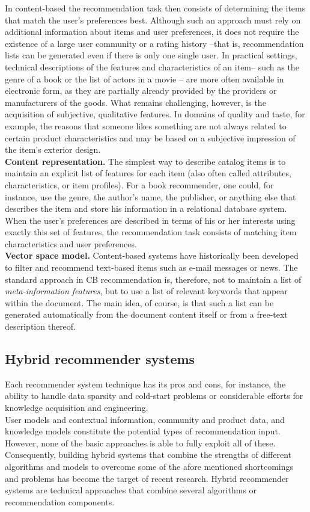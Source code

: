 In content-based the recommendation task then consists of determining
the items that match the user’s preferences best. Although such an
approach must rely on additional information about items and user
preferences, it does not require the existence of a large user
community or a rating history –that is, recommendation lists can be
generated even if there is only one single user. In practical
settings, technical descriptions of the features and characteristics
of an item– such as the genre of a book or the list of actors in a
movie – are more often available in electronic form, as they are
partially already provided by the providers or manufacturers of the
goods. What remains challenging, however, is the acquisition of
subjective, qualitative features. In domains of quality and taste, for
example, the reasons that someone likes something are not always
related to certain product characteristics and may be based on a
subjective impression of the item’s exterior design.   \\
\textbf{Content representation.} The simplest way to describe catalog
items is to maintain an explicit list of features for each item (also
often called attributes, characteristics, or item profiles). For a
book recommender, one could, for instance, use the genre, the author’s
name, the publisher, or anything else that describes the item and
store his information in a relational database system. When the user’s
preferences are described in terms of his or her interests using
exactly this set of features, the recommendation task consists of
matching item characteristics and user preferences.  \\
\textbf{Vector space model.}  Content-based systems have historically
been developed to filter and recommend text-based items such as e-mail
messages or news. The standard approach in CB recommendation is,
therefore, not to maintain a list of \textit{meta-information
features}, but to use a list of relevant keywords that appear within
the document. The main idea, of course, is that such a list can be
generated automatically from the document content itself or from a
free-text description thereof.

\subsection{Hybrid recommender systems} 

Each recommender system technique has its pros and cons, for
instance, the ability to handle data sparsity and cold-start problems
or considerable efforts for knowledge acquisition and engineering. \\
User models and contextual information, community and product data,
and knowledge models constitute the potential types of recommendation
input. However, none of the basic approaches is able to fully exploit
all of these. Consequently, building hybrid systems that combine the
strengths of different algorithms and models to overcome some of the
afore mentioned shortcomings and problems has become the target of
recent research. Hybrid recommender systems are technical approaches
that combine several algorithms or recommendation components.

